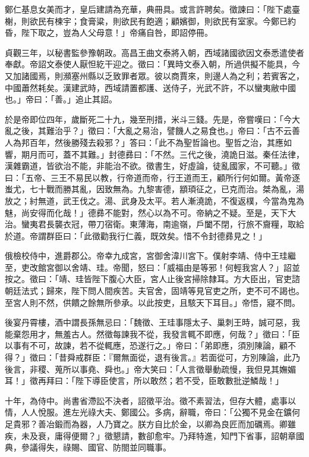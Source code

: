 \begin{pinyinscope}
 鄭仁基息女美而才，皇后建請為充華，典冊具。或言許聘矣。徵諫曰：「陛下處臺榭，則欲民有楝宇；食膏粱，則欲民有飽適；顧嬪御，則欲民有室家。今鄭已約昏，陛下取之，豈為人父母意！」帝痛自咎，即詔停冊。



 貞觀三年，以秘書監參豫朝政。高昌王曲文泰將入朝，西域諸國欲因文泰悉遣使者奉獻。帝詔文泰使人厭怛紇干迎之。徵曰：「異時文泰入朝，所過供擬不能具，今又加諸國焉，則瀕塞州縣以乏致罪者眾。彼以商賈來，則邊人為之利；若賓客之，中國蕭然耗矣。漢建武時，西域請置都護、送侍子，光武不許，不以蠻夷敝中國也。」帝曰：「善。」追止其詔。



 於是帝即位四年，歲斷死二十九，幾至刑措，米斗三錢。先是，帝嘗嘆曰：「今大亂之後，其難治乎？」徵曰：「大亂之易治，譬饑人之易食也。」帝曰：「古不云善人為邦百年，然後勝殘去殺邪？」答曰：「此不為聖哲論也。聖哲之治，其應如響，期月而可，蓋不其難。」封德彞曰：「不然。三代之後，澆詭日滋。秦任法律，漢雜霸道，皆欲治不能，非能治不欲。徵書生，好虛論，徒亂國家，不可聽。」徵曰：「五帝、三王不易民以教，行帝道而帝，行王道而王，顧所行何如爾。黃帝逐蚩尤，七十戰而勝其亂，因致無為。九黎害德，顓頊征之，已克而治。桀為亂，湯放之；紂無道，武王伐之。湯、武身及太平。若人漸澆詭，不復返樸，今當為鬼為魅，尚安得而化哉！」德彞不能對，然心以為不可。帝納之不疑。至是，天下大治。蠻夷君長襲衣冠，帶刀宿衛。東薄海，南逾嶺，戶闔不閉，行旅不齎糧，取給於道。帝謂群臣曰：「此徵勸我行仁義，既效矣。惜不令封德彞見之！」



 俄檢校侍中，進爵郡公。帝幸九成宮，宮御舍湋川宮下。僕射李靖、侍中王珪繼至，吏改館宮御以舍靖、珪。帝聞，怒曰：「威福由是等邪！何輕我宮人？」詔並按之。徵曰：「靖、珪皆陛下腹心大臣，宮人止後宮掃除隸耳。方大臣出，官吏諮朝廷法式；歸來，陛下問人間疾苦。夫官舍，固靖等見官吏之所，吏不可不謁也。至宮人則不然，供饋之餘無所參承。以此按吏，且駭天下耳目。」帝悟，寢不問。



 後宴丹霄樓，酒中謂長孫無忌曰：「魏徵、王珪事隱太子、巢刺王時，誠可惡，我能棄怨用才，無羞古人。然徵每諫我不從，我發言輒不即應，何哉？」徵曰：「臣以事有不可，故諫，若不從輒應，恐遂行之。」帝曰：「弟即應，須別陳論，顧不得？」徵曰：「昔舜戒群臣：『爾無面從，退有後言。』若面從可，方別陳論，此乃後言，非稷、蒐所以事堯、舜也。」帝大笑曰：「人言徵舉動疏慢，我但見其嫵媚耳！」徵再拜曰：「陛下導臣使言，所以敢然；若不受，臣敢數批逆鱗哉！」



 十年，為侍中。尚書省滯訟不決者，詔徵平治。徵不素習法，但存大體，處事以情，人人悅服。進左光祿大夫、鄭國公。多病，辭職，帝曰：「公獨不見金在鑛何足貴邪？善冶鍛而為器，人乃寶之。朕方自比於金，以卿為良匠而加礪焉。卿雖疾，未及衰，庸得便爾？」徵懇請，數卻愈牢。乃拜特進，知門下省事，詔朝章國典，參議得失，祿賜、國官、防閤並同職事。




\end{pinyinscope}
